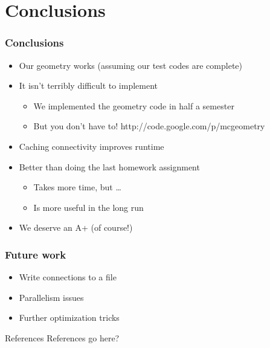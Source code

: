 \documentclass{beamer}
\begin{document}
\section{Conclusions}

\begin{frame}
  \frametitle{Conclusions}
  \begin{itemize}
	 \item Our geometry works (assuming our test codes are complete)
     \item It isn't terribly difficult to implement
         \begin{itemize}
             \item We implemented the geometry code in half a semester
             \item But you don't have to!   http://code.google.com/p/mcgeometry
         \end{itemize}
     \item Caching connectivity improves runtime
     \item Better than doing the last homework assignment
         \begin{itemize}
             \item Takes more time, but …
             \item Is more useful in the long run
         \end{itemize}
	 \item We deserve an A+ (of course!)
  \end{itemize}
\end{frame}

\begin{frame}
  \frametitle{Future work}
  \begin{itemize}
	 \item Write connections to a file
	 \item Parallelism issues
   \item Further optimization tricks
  \end{itemize}
\end{frame}

\appendix
\begin{frame}{References}
  References go here?
\end{frame}
\end{document}
